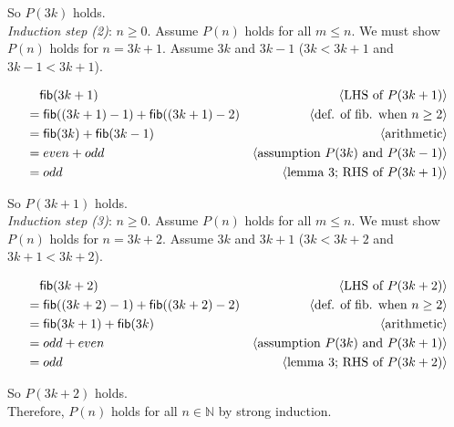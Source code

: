 \documentclass[11pt,fleqn]{article}
\newcommand{\mname}[1]{\mbox{\sf #1}}
\newcommand{\pnote}[1]{{\langle \text{#1} \rangle}}
\begin{document}
\begin{enumerate}
  So $P(3k)$ holds.\\

  \emph{Induction step (2)}: $n \ge 0$. Assume $P(n)$ holds for all $m \le n$. We must show $P(n)$ holds for $n=3k+1$. Assume $3k$ and $3k-1$ ($3k < 3k+1$ and $3k-1 < 3k+1$). 

  \begin{align*}
    &\phantom{{}=} \mname{fib}(3k+1) & \pnote{LHS of $P(3k+1)$}\\
    &= \mname{fib}((3k+1)-1)+\mname{fib}((3k+1)-2) & \pnote{def. of fib. when $n \ge 2$}\\
    &= \mname{fib}(3k)+\mname{fib}(3k-1) & \pnote{arithmetic}\\
    &= even + odd   & \pnote{assumption $P(3k)$ and $P(3k-1)$}\\
    &= odd & \pnote{lemma 3; RHS of $P(3k+1)$}\\
  \end{align*}

  So $P(3k+1)$ holds.\\

  \emph{Induction step (3)}: $n \ge 0$. Assume $P(n)$ holds for all $m \le n$. We must show $P(n)$ holds for $n=3k+2$. Assume $3k$ and $3k+1$ ($3k < 3k+2$ and $3k+1 < 3k+2$). 

  \begin{align*}
    &\phantom{{}=} \mname{fib}(3k+2) & \pnote{LHS of $P(3k+2)$}\\
    &= \mname{fib}((3k+2)-1)+\mname{fib}((3k+2)-2) & \pnote{def. of fib. when $n \ge 2$}\\
    &= \mname{fib}(3k+1)+\mname{fib}(3k) & \pnote{arithmetic}\\
    &= odd + even   & \pnote{assumption $P(3k)$ and $P(3k+1$)}\\
    &= odd & \pnote{lemma 3; RHS of $P(3k+2)$}\\
  \end{align*}

  So $P(3k+2)$ holds.\\


  Therefore, $P(n)$ holds for all $n \in \mathbb{N}$ by strong induction.

  \medskip

\end{enumerate}
\end{document}
